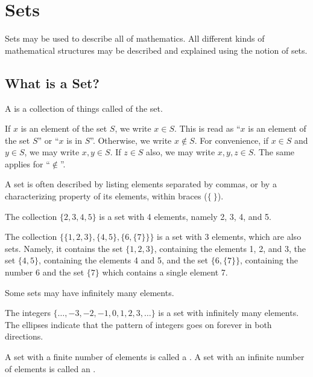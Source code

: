 \chapter{Sets}
Sets may be used to describe all of mathematics. All different kinds of mathematical structures may be described and explained using the notion of sets.

\section{What is a Set?}
\begin{definition}
    A  is a collection of things called  of the set.
\end{definition}

If $x$ is an element of the set $S$, we write $x \in S$. This is read as ``$x$ is an element of the set $S$'' or ``$x$ is in $S$''. Otherwise, we write $x \notin S$. For convenience, if $x \in S$ and $y \in S$, we may write $x, y \in S$. If $z \in S$ also, we may write $x, y, z \in S$. The same applies for ``$\notin$''.

A set is often described by listing elements separated by commas, or by a characterizing property of its elements, within braces ($\{ \ \}$).
\begin{example}
    The collection $\{2, 3, 4, 5\}$ is a set with 4 elements, namely 2, 3, 4, and 5.
\end{example}

\begin{example}
    The collection $\{\{1, 2, 3\}, \{4, 5\}, \{6, \{7\}\}\}$ is a set with 3 elements, which are also sets. Namely, it contains the set $\{1, 2, 3\}$, containing the elements 1, 2, and 3, the set $\{4, 5\}$, containing the elements 4 and 5, and the set $\{6, \{7\}\}$, containing the number 6 and the set $\{7\}$ which contains a single element 7.
\end{example}

Some sets may have infinitely many elements.
\begin{example}
    The integers $\{\dots, -3, -2, -1, 0, 1, 2, 3, \dots\}$ is a set with infinitely many elements. The ellipses indicate that the pattern of integers goes on forever in both directions.
\end{example}

\begin{definition}
    A set with a finite number of elements is called a . A set with an infinite number of elements is called an .
\end{definition}

